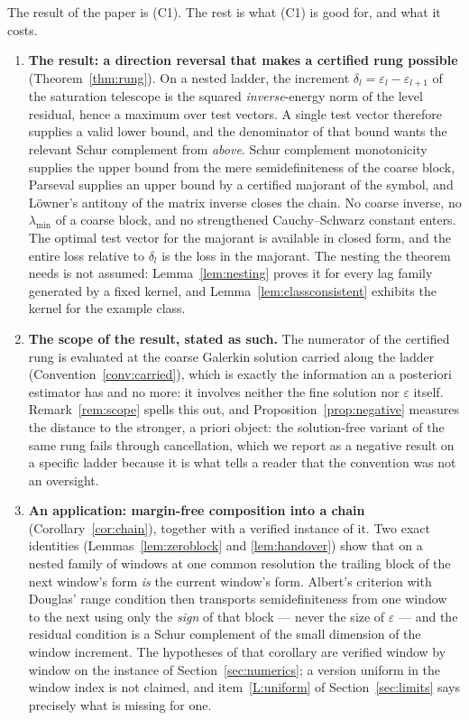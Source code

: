 \documentclass[11pt,a4paper]{article}
\theoremstyle{plain}
\theoremstyle{definition}
\newcommand{\lmin}{\lambda_{\min}}
\begin{document}
The result of the paper is (C1). The rest is what (C1) is good for, and what it costs.

\begin{enumerate}[label=(C\arabic*),leftmargin=3.1em]
\item \textbf{The result: a direction reversal that makes a certified rung possible}
  (Theorem~\ref{thm:rung}). On a nested ladder, the increment
  $\delta_{l}=\varepsilon_{l}-\varepsilon_{l+1}$ of the saturation telescope is the
  squared \emph{inverse}-energy norm of the level residual, hence a maximum over test
  vectors. A single test vector therefore supplies a valid lower bound, and the
  denominator of that bound wants the relevant Schur complement from \emph{above}.
  Schur complement monotonicity \cite{Haynsworth1968} supplies the upper bound from
  the mere semidefiniteness of the coarse block, Parseval supplies an upper bound by
  a certified majorant of the symbol, and L\"owner's antitony of the matrix inverse
  \cite{Loewner1934} closes the chain. No coarse inverse, no $\lmin$ of a coarse
  block, and no strengthened Cauchy--Schwarz constant enters. The optimal test vector
  for the majorant is available in closed form, and the entire loss relative to
  $\delta_{l}$ is the loss in the majorant. The nesting the theorem needs is not
  assumed: Lemma~\ref{lem:nesting} proves it for every lag family generated by a
  fixed kernel, and Lemma~\ref{lem:classconsistent} exhibits the kernel for the
  example class.
\item \textbf{The scope of the result, stated as such.} The numerator of the certified
  rung is evaluated at the coarse Galerkin solution carried along the ladder
  (Convention~\ref{conv:carried}), which is exactly the information an a posteriori
  estimator has and no more: it involves neither the fine solution nor
  $\varepsilon$ itself. Remark~\ref{rem:scope} spells this out, and
  Proposition~\ref{prop:negative} measures the distance to the stronger, a priori
  object: the solution-free variant of the same rung fails through cancellation, which
  we report as a negative result on a specific ladder because it is what tells a reader
  that the convention was not an oversight.
\item \textbf{An application: margin-free composition into a chain}
  (Corollary~\ref{cor:chain}), together with a verified instance of it. Two exact
  identities (Lemmas~\ref{lem:zeroblock} and \ref{lem:handover}) show that on a nested
  family of windows at one common resolution the trailing block of the next window's
  form \emph{is} the current window's form. Albert's criterion \cite{Albert1969} with
  Douglas' range condition \cite{Douglas1966} then transports semidefiniteness from
  one window to the next using only the \emph{sign} of that block --- never the size
  of $\varepsilon$ --- and the residual condition is a Schur complement of the small
  dimension of the window increment. The hypotheses of that corollary are verified
  window by window on the instance of Section~\ref{sec:numerics}; a version uniform in
  the window index is not claimed, and item~\ref{L:uniform} of
  Section~\ref{sec:limits} says precisely what is missing for one.
\end{enumerate}
\end{document}
